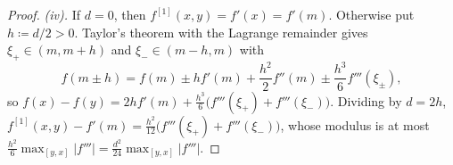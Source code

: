 \begin{proof}
\emph{(iv).} If $d=0$, then $f^{[1]}(x,y)=f'(x)=f'(m)$. Otherwise put
$h\coloneqq d/2>0$. Taylor's theorem with the Lagrange remainder gives
$\xi_{+}\in(m,m+h)$ and $\xi_{-}\in(m-h,m)$ with
\begin{equation*}
  f(m\pm h)=f(m)\pm hf'(m)+\frac{h^{2}}2f''(m)\pm\frac{h^{3}}6f'''(\xi_{\pm}),
\end{equation*}
so $f(x)-f(y)=2hf'(m)+\frac{h^{3}}6\big(f'''(\xi_{+})+f'''(\xi_{-})\big)$.
Dividing by $d=2h$,
$f^{[1]}(x,y)-f'(m)=\frac{h^{2}}{12}\big(f'''(\xi_{+})+f'''(\xi_{-})\big)$,
whose modulus is at most $\frac{h^{2}}6\max_{[y,x]}|f'''|
=\frac{d^{2}}{24}\max_{[y,x]}|f'''|$.
\end{proof}
